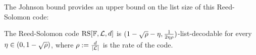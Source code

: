     \noindent
    The Johnson bound provides an upper bound on the list size of this Reed-Solomon code:
    
    \begin{theorem}\label{thm:johnson_bnd}
    The Reed-Solomon code $\mathrm{RS}[\mathbb{F},\mathcal{L},d]$ is $(1-\sqrt{\rho}-\eta,\frac{1}{2\eta\rho})$-list-decodable for every $\eta\in(0,1-\sqrt{\rho})$, where $\rho:=\frac{d}{|\mathcal{L}|}$ is the rate of the code.
    \end{theorem}
    
